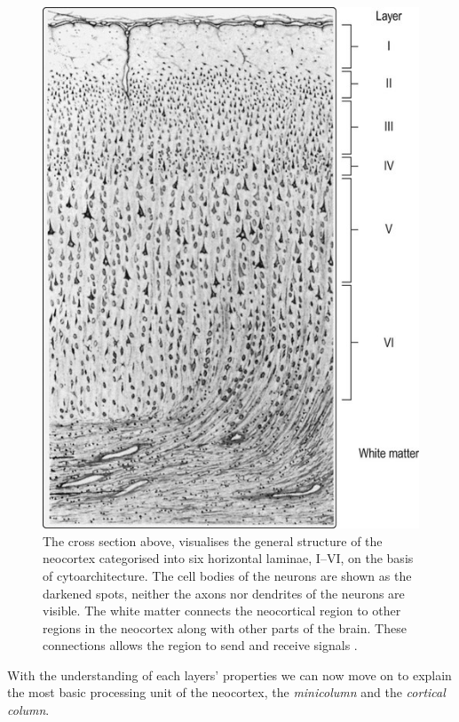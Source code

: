 \begin{figure}[H]
    \centering
    \includegraphics[scale=.88]{appendix/neuroscience/figures/layers.jpg}
    \caption{\cite{IVIlayers} The cross section above, visualises the general structure of the neocortex categorised into six horizontal laminae, I--VI, on the basis of cytoarchitecture. The cell bodies of the neurons are shown as the darkened spots, neither the axons nor dendrites of the neurons are visible. The white matter connects the neocortical region to other regions in the neocortex along with other parts of the brain. These connections allows the region to send and receive signals \cite{Neocortex}.}
    \label{fig:layers}
\end{figure}

\noindent With the understanding of each layers' properties we can now move on to explain the most basic processing unit of the neocortex, the \textit{minicolumn} and the \textit{cortical column}.

